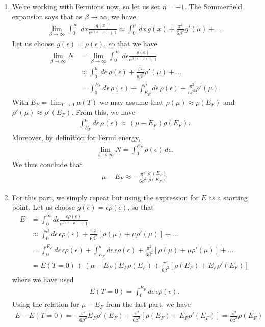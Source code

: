 \documentclass{article}
\theoremstyle{definition}
\newcommand{\be}{\beta}
\newcommand{\f}[2]{\frac{#1}{#2}}
\begin{document}
\begin{enumerate}[label=(\alph*)]
	\item We're working with Fermions now, so let us set $\eta = -1$. The Sommerfield expansion says that as $\be\to \infty$, we have
	\begin{align*}
	\lim_{\be\to \infty}\int_0^\infty \,dx \f{g(x)}{ e^{\be(x-\mu)} + 1} \approx \int_0^\mu \,dx \, g(x) + \f{\pi^2}{6\be^2} g'(\mu) + \dots 
	\end{align*}
	Let us choose $g(\epsilon) = \rho(\epsilon)$, so that we have
	\begin{align*}
	\lim_{\be\to \infty} N &= \lim_{\be\to \infty}\int_0^\infty \,d\epsilon \f{\rho(\epsilon)}{ e^{\be(\epsilon-\mu)} + 1} \\
	&\approx \int_0^\mu \,d\epsilon \, \rho(\epsilon) + \f{\pi^2}{6\be^2} \rho'(\mu) + \dots \\
	&= \int_0^{E_F} d\epsilon \, \rho(\epsilon) + \int_{E_F}^\mu d\epsilon \,\rho(\epsilon) + \f{\pi^2}{6\be^2} \rho'(\mu).
	\end{align*}
	With $E_F = \lim_{T\to 0} \mu(T)$ we may assume that $\rho(\mu)\approx \rho(E_F)$ and $\rho'(\mu) \approx \rho'(E_F)$. From this, we have
	\begin{align*}
	\int_{E_F}^\mu d\epsilon \,\rho(\epsilon)\approx (\mu - E_F) \rho(E_F).
	\end{align*} 
	Moreover, by definition for Fermi energy, 
	\begin{align*}
	\lim_{\be \to \infty} N = \int^{E_F}_0 \rho(\epsilon)\,d\epsilon.
	\end{align*}
	We thus conclude that
	\begin{align*}
	\boxed{\mu - E_F \approx - \f{\pi^2}{6\be^2} \f{\rho'(E_F)}{\rho(E_F)}  }
	\end{align*}
	
	\item For this part, we simply repeat but using the expression for $E$ as a starting point. Let us choose $g(\epsilon) = \epsilon \rho(\epsilon)$, so that 
	\begin{align*}
	E
	&= \int_0^\infty d\epsilon \f{\epsilon \rho(\epsilon)}{e^{\be(\epsilon-\mu)} + 1} \\
	&\approx \int^\mu_0 d\epsilon\, \epsilon\rho(\epsilon) + \f{\pi^2}{6\be^2} [\rho(\mu) + \mu \rho'(\mu)]  + \dots \\
	&= \int^{E_F}_0 d\epsilon\, \epsilon\rho(\epsilon) + \int^{\mu}_{E_F} d\epsilon\, \epsilon\rho(\epsilon) + \f{\pi^2}{6\be^2} [\rho(\mu) + \mu \rho'(\mu)]  + \dots \\
	&= E(T=0) + (\mu - E_F) E_F \rho(E_F) + \f{\pi^2}{6\be^2}[\rho(E_F) + E_F \rho'(E_F)]
	\end{align*}
	where we have used
	\begin{align*}
	E(T=0) = \int^{E_F}_0 d\epsilon\, \epsilon\rho(\epsilon).
	\end{align*}
	Using the relation for $\mu - E_F$ from the last part, we have
	\begin{align*}
	\boxed{E - E(T=0)} = -\f{\pi^2}{6\be^2}E_F \rho'(E_F) + \f{\pi^2}{6\be^2}[\rho(E_F) + E_F \rho'(E_F)] =\boxed{ \f{\pi^2}{6\be^2} \rho(E_F) }
	\end{align*}
	

\end{enumerate}
\end{document}
